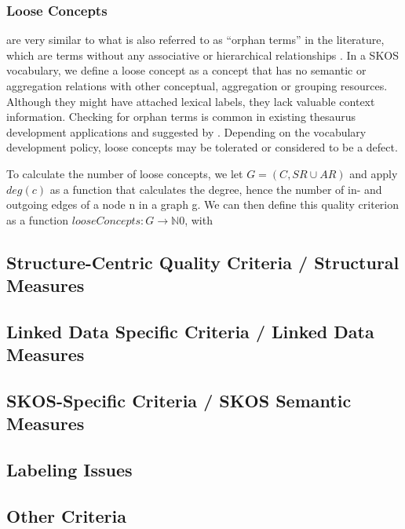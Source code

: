 \documentclass{llncs}
\begin{document}
\subsubsection{Loose Concepts} are very similar to what is also referred to as ``orphan terms” in the literature, which are terms without any associative or hierarchical relationships \cite{Z39.19:2005,Hedden2010}. In a SKOS vocabulary, we define a loose concept as a concept that has no semantic or aggregation relations with other conceptual, aggregation or grouping resources. Although they might have attached lexical labels, they lack valuable context information. Checking for orphan terms is common in existing thesaurus development applications and suggested by \cite{Z39.19:2005}. Depending on the vocabulary development policy, loose concepts may be tolerated or considered to be a defect.

To calculate the number of loose concepts, we let \(G = (C, SR \cup AR)\)  and apply \(deg(c)\) as a function that calculates the degree, hence the number of in- and outgoing edges of a node n in a graph g. We can then define this quality criterion as a function \(looseConcepts : G \rightarrow ℕ0\), with
\begin{definition}
looseConcepts(g) = \left\|\left\{c \in C : deg(c) = 0\right\}}\right\|
\end{definition}

\subsection{Structure-Centric Quality Criteria / Structural Measures}

\subsection{Linked Data Specific Criteria / Linked Data Measures}

\subsection{SKOS-Specific Criteria / SKOS Semantic Measures}

\subsection{Labeling Issues}

\subsection{Other Criteria}
\end{document}
